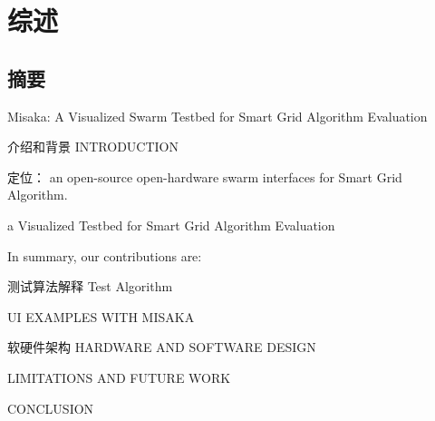 \chapter{综述}
\label{cha:Overview}

\section{摘要}

Misaka: A Visualized Swarm Testbed for Smart Grid Algorithm Evaluation

介绍和背景 INTRODUCTION

定位： an open-source open-hardware swarm interfaces for Smart Grid Algorithm.

a Visualized Testbed for Smart Grid Algorithm Evaluation

In summary, our contributions are:


测试算法解释 Test Algorithm

UI EXAMPLES WITH MISAKA

软硬件架构 HARDWARE AND SOFTWARE DESIGN

LIMITATIONS AND FUTURE WORK

CONCLUSION